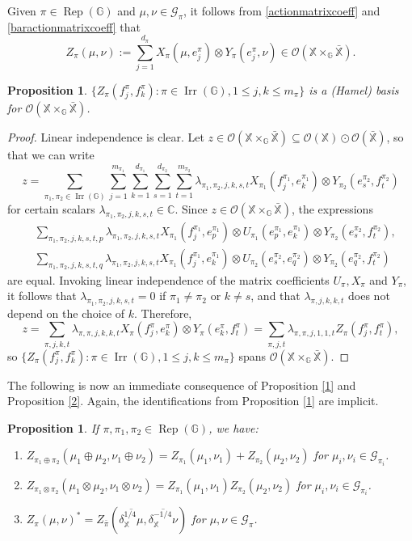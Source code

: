 \documentclass[reqno]{amsart}
\numberwithin{equation}{section}
\newtheorem{Prop}[Theorem]{Proposition}
\newcommand\XGX{\X\times_\G \bar{\X}}
\DeclareMathOperator{\Rep}{\mathrm{Rep}}
\DeclareMathOperator{\Irr}{\mathrm{Irr}}
\newcommand{\mcG}{\mathcal{G}}
\newcommand{\mcO}{\mathcal{O}}
\newcommand{\C}{\mathbb{C}}
\newcommand{\G}{\mathbb{G}}
\newcommand{\X}{\mathbb{X}}
\begin{document}
Given $\pi\in \Rep(\G)$ and $\mu, \nu \in \mcG_\pi$, it follows from \eqref{actionmatrixcoeff} and \eqref{baractionmatrixcoeff} that
$$Z_\pi(\mu, \nu):= \sum_{j=1}^{d_\pi} X_\pi(\mu, e_j^\pi)\otimes Y_\pi(e_j^\pi, \nu) \in \mcO(\XGX).$$
\begin{Prop}\label{Hamel}
   $\{Z_\pi(f_j^\pi, f_k^\pi): \pi\in \Irr(\G), 1\le j,k\le m_\pi\}$ is a (Hamel) basis for $\mcO(\XGX)$. 
\end{Prop}
\begin{proof}
    Linear independence is clear. Let $z\in \mcO(\XGX)\subseteq \mcO(\X)\odot \mcO(\bar{\X})$, so that we can write
    $$z = \sum_{\pi_1, \pi_2\in \Irr(\G)} \sum_{j=1}^{m_{\pi_1}} \sum_{k=1}^{d_{\pi_1}} \sum_{s=1}^{d_{\pi_2}} \sum_{t=1}^{m_{\pi_2}}  \lambda_{\pi_1, \pi_2, j,k,s,t}X_{\pi_1}(f_j^{\pi_1}, e_k^{\pi_1}) \otimes Y_{\pi_2}(e_s^{\pi_2}, f_t^{\pi_2})$$
    for certain scalars $\lambda_{\pi_1, \pi_2, j,k,s,t}\in \C$. Since $z\in \mcO(\XGX)$, the expressions
    \begin{align*}
        &\sum_{\pi_1, \pi_2,j,k,s,t,p} \lambda_{\pi_1, \pi_2,j,k,s,t} X_{\pi_1}(f_j^{\pi_1}, e_p^{\pi_1}) \otimes U_{\pi_1}(e_p^{\pi_1}, e_k^{\pi_1}) \otimes Y_{\pi_2}(e_s^{\pi_2}, f_t^{\pi_2}), \\
        &\sum_{\pi_1, \pi_2, j,k,s,t,q} \lambda_{\pi_1, \pi_2, j,k,s,t} X_{\pi_1} (f_j^{\pi_1}, e_{k}^{\pi_1})\otimes U_{\pi_2}(e_s^{\pi_2}, e_q^{\pi_2})\otimes Y_{\pi_2}(e_q^{\pi_2}, f_t^{\pi_2})
    \end{align*}
    are equal. Invoking linear independence of the matrix coefficients $U_\pi, X_\pi$ and $Y_\pi$, it follows that $\lambda_{\pi_1, \pi_2,j,k,s,t}= 0$ if $\pi_1\ne \pi_2$ or $k\ne s$, and that $\lambda_{\pi,j,k,k,t}$ does not depend on the choice of $k$. Therefore,
    $$z= \sum_{\pi, j,k,t}  \lambda_{\pi, \pi, j,k,k,t} X_{\pi}(f_j^\pi, e_k^\pi) \otimes Y_{\pi}(e_k^\pi, f_t^\pi)= \sum_{\pi,j,t}  \lambda_{\pi, \pi, j,1,1,t} Z_\pi(f_j^\pi, f_t^\pi),$$
    so $\{Z_\pi(f_j^\pi, f_k^\pi): \pi\in \Irr(\G), 1\le j,k\le m_\pi\}$ spans $\mcO(\XGX)$.
\end{proof}

The following is now an immediate consequence of Proposition \ref{1} and Proposition \ref{2}. Again, the identifications from Proposition \ref{1} are implicit. 
\begin{Prop}\label{3} If $\pi, \pi_1, \pi_2\in\Rep(\G)$, we have:
\begin{enumerate} 
    \item $Z_{\pi_1\oplus \pi_2}(\mu_1\oplus \mu_2, \nu_1\oplus \nu_2)= Z_{\pi_1}(\mu_1, \nu_1)+ Z_{\pi_2}(\mu_2, \nu_2)$ for $\mu_i, \nu_i\in \mcG_{\pi_i}$.
     \item\vspace{-1.5mm} $Z_{\pi_1\otimes \pi_2}(\mu_1\otimes \mu_2, \nu_1\otimes \nu_2) = Z_{\pi_1}(\mu_1, \nu_1)Z_{\pi_2}(\mu_2, \nu_2)$ for $\mu_i, \nu_i\in \mcG_{\pi_i}$.
        \item\vspace{-1.5mm} $Z_\pi(\mu, \nu)^* = Z_{\bar{\pi}}(\overline{\delta_\X^{1/4}\mu}, \overline{\delta_\X^{-1/4}\nu})$ for $\mu, \nu \in \mcG_\pi$.
\end{enumerate}
\end{Prop}
\end{document}
